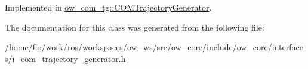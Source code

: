 Implemented in \hyperlink{classow__com__tg_1_1COMTrajectoryGenerator_acec7a01af30b57cd99962a3e5d7bdf4f}{ow\+\_\+com\+\_\+tg\+::\+C\+O\+M\+Trajectory\+Generator}.



The documentation for this class was generated from the following file\+:\begin{DoxyCompactItemize}
\item 
/home/flo/work/ros/workspaces/ow\+\_\+ws/src/ow\+\_\+core/include/ow\+\_\+core/interfaces/\hyperlink{i__com__trajectory__generator_8h}{i\+\_\+com\+\_\+trajectory\+\_\+generator.\+h}\end{DoxyCompactItemize}
